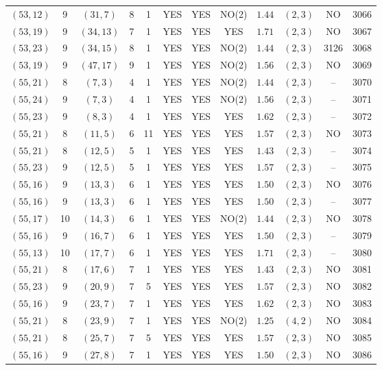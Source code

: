 \begin{longtable}{|c|c|c|c|c|c|c|c|c|c|c|c|}
$(53,12)$ & 9 & $(31,7)$ & 8 & 1 & YES & YES & NO(2) & $1.44$ & $(2,3)$ & NO & 3066\\
$(53,19)$ & 9 & $(34,13)$ & 7 & 1 & YES & YES & YES & $1.71$ & $(2,3)$ & NO & 3067\\
$(53,23)$ & 9 & $(34,15)$ & 8 & 1 & YES & YES & NO(2) & $1.44$ & $(2,3)$ & 3126 & 3068\\
$(53,19)$ & 9 & $(47,17)$ & 9 & 1 & YES & YES & NO(2) & $1.56$ & $(2,3)$ & NO & 3069\\
$(55,21)$ & 8 & $(7,3)$ & 4 & 1 & YES & YES & NO(2) & $1.44$ & $(2,3)$ & -- & 3070\\
$(55,24)$ & 9 & $(7,3)$ & 4 & 1 & YES & YES & NO(2) & $1.56$ & $(2,3)$ & -- & 3071\\
$(55,23)$ & 9 & $(8,3)$ & 4 & 1 & YES & YES & YES & $1.62$ & $(2,3)$ & -- & 3072\\
$(55,21)$ & 8 & $(11,5)$ & 6 & 11 & YES & YES & YES & $1.57$ & $(2,3)$ & NO & 3073\\
$(55,21)$ & 8 & $(12,5)$ & 5 & 1 & YES & YES & YES & $1.43$ & $(2,3)$ & -- & 3074\\
$(55,23)$ & 9 & $(12,5)$ & 5 & 1 & YES & YES & YES & $1.57$ & $(2,3)$ & -- & 3075\\
$(55,16)$ & 9 & $(13,3)$ & 6 & 1 & YES & YES & YES & $1.50$ & $(2,3)$ & NO & 3076\\
$(55,16)$ & 9 & $(13,3)$ & 6 & 1 & YES & YES & YES & $1.50$ & $(2,3)$ & -- & 3077\\
$(55,17)$ & 10 & $(14,3)$ & 6 & 1 & YES & YES & NO(2) & $1.44$ & $(2,3)$ & NO & 3078\\
$(55,16)$ & 9 & $(16,7)$ & 6 & 1 & YES & YES & YES & $1.50$ & $(2,3)$ & -- & 3079\\
$(55,13)$ & 10 & $(17,7)$ & 6 & 1 & YES & YES & YES & $1.71$ & $(2,3)$ & -- & 3080\\
$(55,21)$ & 8 & $(17,6)$ & 7 & 1 & YES & YES & YES & $1.43$ & $(2,3)$ & NO & 3081\\
$(55,23)$ & 9 & $(20,9)$ & 7 & 5 & YES & YES & YES & $1.57$ & $(2,3)$ & NO & 3082\\
$(55,16)$ & 9 & $(23,7)$ & 7 & 1 & YES & YES & YES & $1.62$ & $(2,3)$ & NO & 3083\\
$(55,21)$ & 8 & $(23,9)$ & 7 & 1 & YES & YES & NO(2) & $1.25$ & $(4,2)$ & NO & 3084\\
$(55,21)$ & 8 & $(25,7)$ & 7 & 5 & YES & YES & YES & $1.57$ & $(2,3)$ & NO & 3085\\
$(55,16)$ & 9 & $(27,8)$ & 7 & 1 & YES & YES & YES & $1.50$ & $(2,3)$ & NO & 3086\\

\end{longtable}
